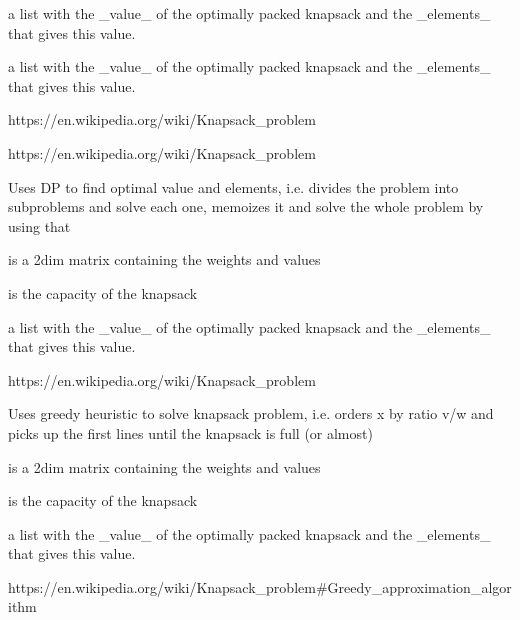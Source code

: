 \documentclass[a4paper]{book}
\begin{document}
%
\begin{Value}
a list with the \_value\_ of the optimally packed knapsack and the \_elements\_ that gives this value.

a list with the \_value\_ of the optimally packed knapsack and the \_elements\_ that gives this value.
\end{Value}
%
\begin{References}\relax
https://en.wikipedia.org/wiki/Knapsack\_problem

https://en.wikipedia.org/wiki/Knapsack\_problem
\end{References}
%
\begin{Description}\relax
Uses DP to find optimal value and elements, i.e. divides the problem into subproblems and solve each one, memoizes it and solve the whole problem by using that
\end{Description}
%
\begin{Arguments}
\begin{ldescription}
\item[\code{x}] is a 2dim matrix containing the weights and values

\item[\code{W}] is the capacity of the knapsack
\end{ldescription}
\end{Arguments}
%
\begin{Value}
a list with the \_value\_ of the optimally packed knapsack and the \_elements\_ that gives this value.
\end{Value}
%
\begin{References}\relax
https://en.wikipedia.org/wiki/Knapsack\_problem
\end{References}
%
\begin{Description}\relax
Uses greedy heuristic to solve knapsack problem, i.e. orders x by ratio v/w and
picks up the first lines until the knapsack is full (or almost)
\end{Description}
%
\begin{Arguments}
\begin{ldescription}
\item[\code{x}] is a 2dim matrix containing the weights and values

\item[\code{W}] is the capacity of the knapsack
\end{ldescription}
\end{Arguments}
%
\begin{Value}
a list with the \_value\_ of the optimally packed knapsack and the \_elements\_ that gives this value.
\end{Value}
%
\begin{References}\relax
https://en.wikipedia.org/wiki/Knapsack\_problem\#Greedy\_approximation\_algorithm
\end{References}
\printindex{}
\end{document}
